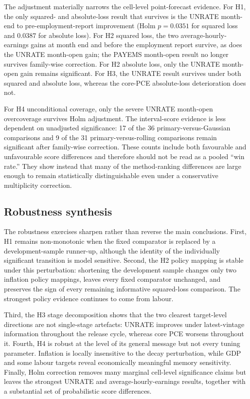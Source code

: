 The adjustment materially narrows the cell-level point-forecast evidence. For
H1, the only squared- and absolute-loss result that survives is the UNRATE
month-end to pre-employment-report improvement (Holm \(p=0.0351\) for squared
loss and \(0.0387\) for absolute loss). For H2 squared loss, the two
average-hourly-earnings gains at month end and before the employment report
survive, as does the UNRATE month-open gain; the PAYEMS month-open result no
longer survives family-wise correction. For H2 absolute loss, only the
UNRATE month-open gain remains significant. For H3, the UNRATE result
survives under both squared and absolute loss, whereas the core-PCE
absolute-loss deterioration does not.

For H4 unconditional coverage, only the severe UNRATE month-open overcoverage
survives Holm adjustment. The interval-score evidence is less dependent on
unadjusted significance: 17 of the 36 primary-versus-Gaussian comparisons and
9 of the 31 primary-versus-rolling comparisons remain significant after
family-wise correction. These counts include both favourable and
unfavourable score differences and therefore should not be read as a pooled
``win rate.'' They show instead that many of the method-ranking differences
are large enough to remain statistically distinguishable even under a
conservative multiplicity correction.

\subsection{Robustness synthesis}
\label{subsec:robustness_synthesis}

The robustness exercises sharpen rather than reverse the main conclusions.
First, H1 remains non-monotonic when the fixed comparator is replaced by a
development-sample runner-up, although the identity of the individually
significant transition is model sensitive. Second, the H2 policy mapping is stable under this perturbation:
shortening the development sample changes only two inflation policy mappings,
leaves every fixed comparator unchanged, and preserves the sign of every
remaining informative squared-loss comparison. The strongest policy evidence
continues to come from labour.

Third, the H3 stage decomposition shows that the two clearest target-level
directions are not single-stage artefacts: UNRATE improves under
latest-vintage information throughout the release cycle, whereas core PCE
worsens throughout it. Fourth, H4 is robust at the level of its general
message but not every tuning parameter. Inflation is locally insensitive to
the decay perturbation, while GDP and some labour targets reveal economically
meaningful memory sensitivity. Finally, Holm correction removes many
marginal cell-level significance claims but leaves the strongest UNRATE and
average-hourly-earnings results, together with a substantial set of
probabilistic score differences.

